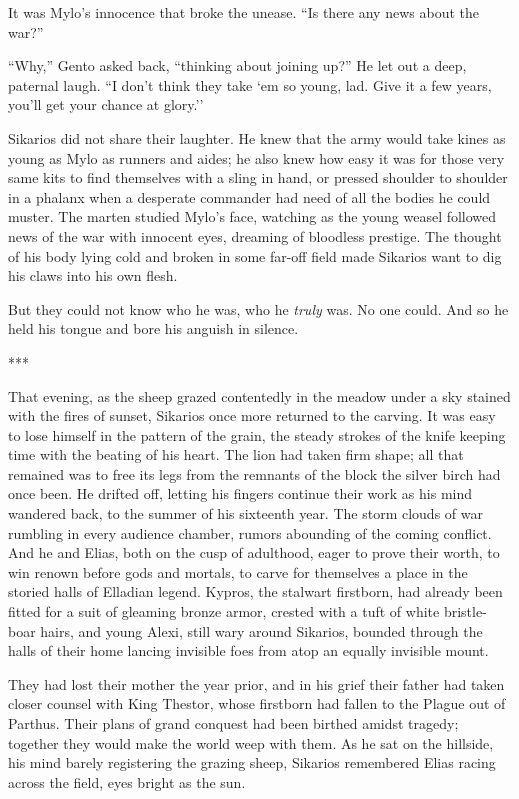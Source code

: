 It was Mylo's innocence that broke the unease. ``Is there any news about the war?''

``Why,'' Gento asked back, ``thinking about joining up?'' He let out a deep, paternal laugh. ``I don't think they take `em so young, lad. Give it a few years, you'll get your chance at glory.''

Sikarios did not share their laughter. He knew that the army would take kines as young as Mylo as runners and aides; he also knew how easy it was for those very same kits to find themselves with a sling in hand, or pressed shoulder to shoulder in a phalanx when a desperate commander had need of all the bodies he could muster. The marten studied Mylo's face, watching as the young weasel followed news of the war with innocent eyes, dreaming of bloodless prestige. The thought of his body lying cold and broken in some far-off field made Sikarios want to dig his claws into his own flesh.

But they could not know who he was, who he \emph{truly} was. No one could. And so he held his tongue and bore his anguish in silence.

***

That evening, as the sheep grazed contentedly in the meadow under a sky stained with the fires of sunset, Sikarios once more returned to the carving. It was easy to lose himself in the pattern of the grain, the steady strokes of the knife keeping time with the beating of his heart. The lion had taken firm shape; all that remained was to free its legs from the remnants of the block the silver birch had once been. He drifted off, letting his fingers continue their work as his mind wandered back, to the summer of his sixteenth year. The storm clouds of war rumbling in every audience chamber, rumors abounding of the coming conflict. And he and Elias, both on the cusp of adulthood, eager to prove their worth, to win renown before gods and mortals, to carve for themselves a place in the storied halls of Elladian legend. Kypros, the stalwart firstborn, had already been fitted for a suit of gleaming bronze armor, crested with a tuft of white bristle-boar hairs, and young Alexi, still wary around Sikarios, bounded through the halls of their home lancing invisible foes from atop an equally invisible mount.

They had lost their mother the year prior, and in his grief their father had taken closer counsel with King Thestor, whose firstborn had fallen to the Plague out of Parthus. Their plans of grand conquest had been birthed amidst tragedy; together they would make the world weep with them. As he sat on the hillside, his mind barely registering the grazing sheep, Sikarios remembered Elias racing across the field, eyes bright as the sun.

